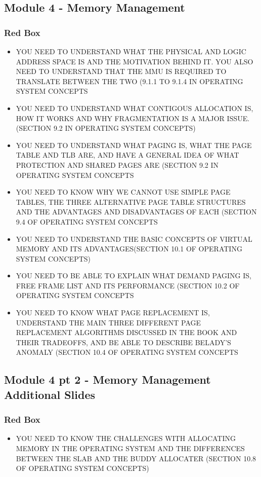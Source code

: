 \documentclass{article}
\begin{document}
\subsection{Module 4 - Memory Management}
\subsubsection{Red Box}
\begin{itemize}
    \item YOU NEED TO UNDERSTAND WHAT THE PHYSICAL AND LOGIC ADDRESS SPACE IS AND THE MOTIVATION BEHIND IT. YOU ALSO NEED TO UNDERSTAND THAT
    THE MMU IS REQUIRED TO TRANSLATE BETWEEN THE TWO (9.1.1 TO 9.1.4 IN OPERATING SYSTEM CONCEPTS
    \item YOU NEED TO UNDERSTAND WHAT CONTIGOUS ALLOCATION IS, HOW IT WORKS AND WHY FRAGMENTATION IS A MAJOR ISSUE.
    (SECTION 9.2 IN OPERATING SYSTEM CONCEPTS)
    \item YOU NEED TO UNDERSTAND WHAT PAGING IS, WHAT THE PAGE TABLE AND TLB ARE, AND HAVE A GENERAL IDEA OF WHAT PROTECTION AND SHARED
    PAGES ARE (SECTION 9.2 IN OPERATING SYSTEM CONCEPTS
    \item YOU NEED TO KNOW WHY WE CANNOT USE SIMPLE PAGE TABLES, THE THREE ALTERNATIVE PAGE TABLE STRUCTURES AND THE ADVANTAGES AND
    DISADVANTAGES OF EACH (SECTION 9.4 OF OPERATING SYSTEM CONCEPTS
    \item YOU NEED TO UNDERSTAND THE BASIC CONCEPTS OF VIRTUAL MEMORY AND ITS ADVANTAGES(SECTION 10.1 OF OPERATING SYSTEM CONCEPTS)
    \item YOU NEED TO BE ABLE TO EXPLAIN WHAT DEMAND PAGING IS, FREE FRAME LIST AND ITS PERFORMANCE (SECTION 10.2 OF OPERATING SYSTEM CONCEPTS
    \item YOU NEED TO KNOW WHAT PAGE REPLACEMENT IS, UNDERSTAND THE MAIN THREE DIFFERENT PAGE REPLACEMENT ALGORITHMS DISCUSSED IN THE BOOK
    AND THEIR TRADEOFFS, AND BE ABLE TO DESCRIBE BELADY’S ANOMALY (SECTION 10.4 OF OPERATING SYSTEM CONCEPTS
\end{itemize}



\subsection{Module 4 pt 2 - Memory Management Additional Slides}
\subsubsection{Red Box}
\begin{itemize}
    \item YOU NEED TO KNOW THE CHALLENGES WITH ALLOCATING MEMORY IN THE OPERATING SYSTEM AND THE DIFFERENCES BETWEEN THE SLAB AND THE BUDDY
    ALLOCATER (SECTION 10.8 OF OPERATING SYSTEM CONCEPTS)
\end{itemize}
\end{document}
